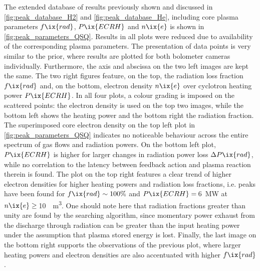 %
    The extended database of results previously shown and discussed in \cref{fig:peak_database_H2} and \ref{fig:peak_database_He}, including core plasma parameters $f\ix{rad}$, $P\ix{ECRH}$ and $n\ix{e}$ is shown in \cref{fig:peak_parameters_QSQ}. Results in all plots were reduced due to availability of the corresponding plasma parameters. The presentation of data points is very similar to the prior, where results are plotted for both bolometer cameras individually. Furthermore, the axis and abscissa on the two left images are kept the same. The two right figures feature, on the top, the radiation loss fraction $f\ix{rad}$ and, on the bottom, electron density $n\ix{e}$ over cyclotron heating power $P\ix{ECRH}$. In all four plots, a colour grading is imposed on the scattered points: the electron density is used on the top two images, while the bottom left shows the heating power and the bottom right the radiation fraction.\\%
    The superimposed core electron density on the top left plot in \cref{fig:peak_parameters_QSQ} indicates no noticeable behaviour across the entire spectrum of gas flows and radiation powers. On the bottom left plot, $P\ix{ECRH}$ is higher for larger changes in radiation power loss $\Delta P\ix{rad}$, while no correlation to the latency between feedback action and plasma reaction therein is found. The plot on the top right features a clear trend of higher electron densities for higher heating powers and radiation loss fractions, i.e. peaks have been found for $f\ix{rad}\sim100\%$ and $P\ix{ECRH}=\,$\SI{6}{\mega\watt} at $n\ix{e}\ge\,$\SI{10}{\per\cubic\meter}. One should note here that radiation fractions greater than unity are found by the searching algorithm, since momentary power exhaust from the discharge through radiation can be greater than the input heating power under the assumption that plasma stored energy is lost. Finally, the last image on the bottom right supports the observations of the previous plot, where larger heating powers and electron densities are also accentuated with higher $f\ix{rad}$.\\%
